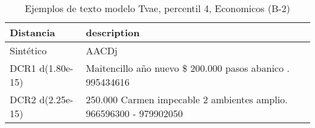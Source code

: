 \begin{table}[H]
\centering
\fontsize{10}{14}\selectfont
\caption{Ejemplos de texto modelo Tvae, percentil 4, Economicos (B-2)}
\label{table-example-economicos-b-2-tvae-4p-text}
\begin{tabular}{|l|m{35em}|}
\hline
\rowcolor[gray]{0.8}
Distancia & description \\
\hline Sintético & AACDj \\
\hline DCR1 d(1.80e-15) & Maitencillo a\~no nuevo \$ 200.000  pasos abanico . 995434616 \\
\hline DCR2 d(2.25e-15) & 250.000 Carmen impecable 2 ambientes amplio. 966596300 - 979902050 \\
\hline
\end{tabular}
\end{table}
